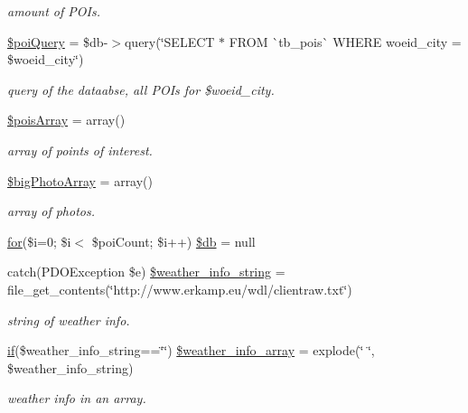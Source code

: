 \begin{DoxyCompactItemize}
\begin{DoxyCompactList}\small\item\em amount of P\+O\+Is. \end{DoxyCompactList}\item 
\mbox{\hyperlink{rotterdam_2index_8php_a735d09bd88bab2d39b5d123b6a1ac7e9}{\$poi\+Query}} = \$db-\/$>$query(\char`\"{}S\+E\+L\+E\+CT $\ast$ F\+R\+OM \`{}tb\+\_\+pois\`{} W\+H\+E\+RE woeid\+\_\+city = \$woeid\+\_\+city\char`\"{})
\begin{DoxyCompactList}\small\item\em query of the dataabse, all P\+O\+Is for \$woeid\+\_\+city. \end{DoxyCompactList}\item 
\mbox{\hyperlink{rotterdam_2index_8php_aba22eb823924400ba310cca9821c67b3}{\$pois\+Array}} = array()
\begin{DoxyCompactList}\small\item\em array of points of interest. \end{DoxyCompactList}\item 
\mbox{\hyperlink{rotterdam_2index_8php_aab544b20d0152a1bf9eeb8db3e9f0577}{\$big\+Photo\+Array}} = array()
\begin{DoxyCompactList}\small\item\em array of photos. \end{DoxyCompactList}\item 
\mbox{\hyperlink{index_8php_aa11bce3c9d33806cade344b0536e0508}{for}}(\$i=0; \$i$<$ \$poi\+Count; \$i++) \mbox{\hyperlink{rotterdam_2index_8php_ae26e87d17180fc87313d19b439092f0f}{\$db}} = null
\item 
catch(P\+D\+O\+Exception \$e) \mbox{\hyperlink{rotterdam_2index_8php_aa85edc6c515eee98e2848667893e007d}{\$weather\+\_\+info\+\_\+string}} = file\+\_\+get\+\_\+contents(\char`\"{}http\+://www.\+erkamp.\+eu/wdl/clientraw.\+txt\char`\"{})
\begin{DoxyCompactList}\small\item\em string of weather info. \end{DoxyCompactList}\item 
\mbox{\hyperlink{hull_2index_8php_a8f0d8893361d6307986497540738a8bf}{if}}(\$weather\+\_\+info\+\_\+string==\char`\"{}\char`\"{}) \mbox{\hyperlink{rotterdam_2index_8php_a16271cc4158d1822fa59adaf196eb3d4}{\$weather\+\_\+info\+\_\+array}} = explode(\char`\"{} \char`\"{}, \$weather\+\_\+info\+\_\+string)
\begin{DoxyCompactList}\small\item\em weather info in an array. \end{DoxyCompactList}\item 

\end{DoxyCompactItemize}
